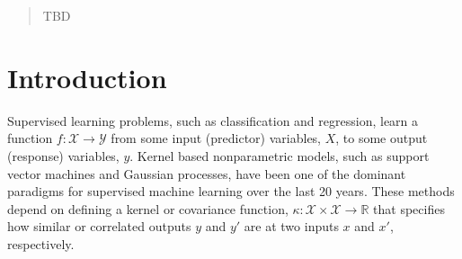 \documentclass[twoside]{article}
\begin{document}
\def\ie{i.e.\ }
\def\eg{e.g.\ }
\def\iid{i.i.d.\ }
\def\simiid{\sim_{\mbox{\tiny iid}}}
\def\eqdist{\stackrel{\mbox{\tiny d}}{=}}

\def\Reals{\mathbb{R}}

\def\Uniform{\mbox{\rm Uniform}}
\def\Bernoulli{\mbox{\rm Bernoulli}}
\def\GP{\mathcal{GP}}

\def\inputVar{x}
\def\InputVar{X}
\def\InputSpace{\mathcal{X}}
\def\outputVar{y}
\def\OutputSpace{\mathcal{Y}}
\def\function{f}
\def\kernel{\kappa}
\def\KernelMatrix{K}
\def\SumKernel{\sum}
\def\ProductKernel{\prod}
\def\expression{e}


\begin{abstract}
TBD
\end{abstract}

\section{Introduction}

Supervised learning problems, such as classification and regression, learn a function ${\function : \InputSpace \to \OutputSpace}$ from some input (predictor) variables, $\InputVar$, to some output (response) variables, $\outputVar$.
Kernel based nonparametric models, such as support vector machines and Gaussian processes, have been one of the dominant paradigms for supervised machine learning over the last 20 years.
These methods depend on defining a kernel or covariance function, $\kernel : \InputSpace \times \InputSpace \to \Reals$ that specifies how similar or correlated outputs $\outputVar$ and $\outputVar'$ are at two inputs $\inputVar$ and $\inputVar'$, respectively.
\end{document}
